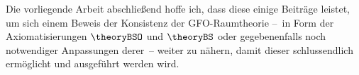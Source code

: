 \bigskip \noindent
Die vorliegende Arbeit abschließend hoffe ich, dass diese einige Beiträge leistet, um sich einem
Beweis der Konsistenz der GFO-Raumtheorie --~in Form der Axiomatisierungen $\theoryBSO$ und $\theoryBS$ oder gegebenenfalls noch notwendiger Anpassungen derer~-- weiter zu nähern, damit dieser schlussendlich ermöglicht und ausgeführt werden wird.
% 
% 
% 
%     
%              
%         
% 
%     
%     
%     
%     
%     
%     
%     
